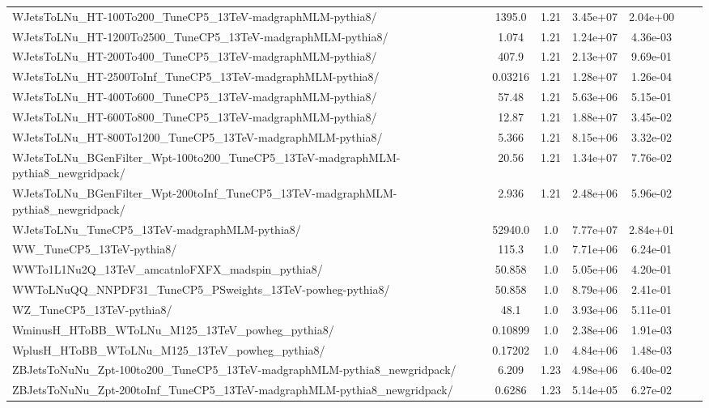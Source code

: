 \begin{table}
\begin{center}
{\begin{tabular}{|l|c|c|c|c|c|c|}
WJetsToLNu\_HT-100To200\_TuneCP5\_13TeV-madgraphMLM-pythia8/ & 1395.0 & 1.21 & 3.45e+07 & {\color{red}2.04e+00} \\
WJetsToLNu\_HT-1200To2500\_TuneCP5\_13TeV-madgraphMLM-pythia8/ & 1.074 & 1.21 & 1.24e+07 & 4.36e-03 \\
WJetsToLNu\_HT-200To400\_TuneCP5\_13TeV-madgraphMLM-pythia8/ & 407.9 & 1.21 & 2.13e+07 & {\color{orange}9.69e-01} \\
WJetsToLNu\_HT-2500ToInf\_TuneCP5\_13TeV-madgraphMLM-pythia8/ & 0.03216 & 1.21 & 1.28e+07 & 1.26e-04 \\
WJetsToLNu\_HT-400To600\_TuneCP5\_13TeV-madgraphMLM-pythia8/ & 57.48 & 1.21 & 5.63e+06 & {\color{orange}5.15e-01} \\
WJetsToLNu\_HT-600To800\_TuneCP5\_13TeV-madgraphMLM-pythia8/ & 12.87 & 1.21 & 1.88e+07 & 3.45e-02 \\
WJetsToLNu\_HT-800To1200\_TuneCP5\_13TeV-madgraphMLM-pythia8/ & 5.366 & 1.21 & 8.15e+06 & 3.32e-02 \\
WJetsToLNu\_BGenFilter\_Wpt-100to200\_TuneCP5\_13TeV-madgraphMLM-pythia8\_newgridpack/ & 20.56 & 1.21 & 1.34e+07 & 7.76e-02 \\
WJetsToLNu\_BGenFilter\_Wpt-200toInf\_TuneCP5\_13TeV-madgraphMLM-pythia8\_newgridpack/ & 2.936 & 1.21 & 2.48e+06 & 5.96e-02 \\
WJetsToLNu\_TuneCP5\_13TeV-madgraphMLM-pythia8/ & 52940.0 & 1.0 & 7.77e+07 & {\color{red}2.84e+01} \\
WW\_TuneCP5\_13TeV-pythia8/ & 115.3 & 1.0 & 7.71e+06 & {\color{orange}6.24e-01} \\
WWTo1L1Nu2Q\_13TeV\_amcatnloFXFX\_madspin\_pythia8/ & 50.858 & 1.0 & 5.05e+06 & {\color{orange}4.20e-01} \\
WWToLNuQQ\_NNPDF31\_TuneCP5\_PSweights\_13TeV-powheg-pythia8/ & 50.858 & 1.0 & 8.79e+06 & 2.41e-01 \\
WZ\_TuneCP5\_13TeV-pythia8/ & 48.1 & 1.0 & 3.93e+06 & {\color{orange}5.11e-01} \\
WminusH\_HToBB\_WToLNu\_M125\_13TeV\_powheg\_pythia8/ & 0.10899 & 1.0 & 2.38e+06 & 1.91e-03 \\
WplusH\_HToBB\_WToLNu\_M125\_13TeV\_powheg\_pythia8/ & 0.17202 & 1.0 & 4.84e+06 & 1.48e-03 \\
ZBJetsToNuNu\_Zpt-100to200\_TuneCP5\_13TeV-madgraphMLM-pythia8\_newgridpack/ & 6.209 & 1.23 & 4.98e+06 & 6.40e-02 \\
ZBJetsToNuNu\_Zpt-200toInf\_TuneCP5\_13TeV-madgraphMLM-pythia8\_newgridpack/ & 0.6286 & 1.23 & 5.14e+05 & 6.27e-02 \\

\end{tabular}}
\end{center}
\end{table}
